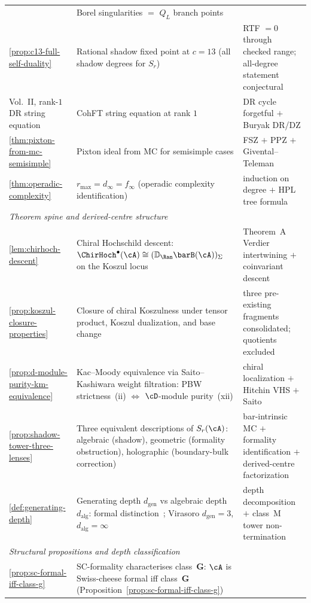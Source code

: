 \begin{center}
\begin{tabular}{lp{8cm}l}
 & Borel singularities $=$ $Q_L$ branch points \\
\ref{prop:c13-full-self-duality}
 & Rational shadow fixed point at $c = 13$
 \textup{(}all shadow degrees for \(S_r\)\textup{)}
 & RTF \(=0\) through checked range; all-degree statement conjectural \\
Vol.~II, rank-$1$ DR string equation
 & CohFT string equation at rank $1$ & DR cycle forgetful $+$ Buryak DR/DZ \\
\ref{thm:pixton-from-mc-semisimple}
 & Pixton ideal from MC for semisimple cases
 & FSZ $+$ PPZ $+$ Givental--Teleman \\
\ref{thm:operadic-complexity}
 & $r_{\max} = d_\infty = f_\infty$
 \textup{(}operadic complexity identification\textup{)}
 & induction on degree $+$ HPL tree formula \\
\hline
\multicolumn{3}{l}{\textit{Theorem spine and derived-centre structure}} \\
\hline
\ref{lem:chirhoch-descent}
 & Chiral Hochschild descent:
 $\ChirHoch^{\bullet}(\cA)
 \cong (\mathbb{D}_{\Ran}\barB(\cA))_{\Sigma}$
 on the Koszul locus
 & Theorem~A Verdier intertwining $+$ coinvariant descent \\
\ref{prop:koszul-closure-properties}
 & Closure of chiral Koszulness under tensor product,
 Koszul dualization, and base change
 & three pre-existing fragments consolidated;
 quotients excluded \\
\ref{prop:d-module-purity-km-equivalence}
 & Kac--Moody equivalence via Saito--Kashiwara weight
 filtration: PBW strictness~(ii) $\iff$
 $\cD$-module purity~(xii)
 & chiral localization $+$ Hitchin VHS $+$ Saito \\
\ref{prop:shadow-tower-three-lenses}
 & Three equivalent descriptions of $S_r(\cA)$:
 algebraic (shadow), geometric (formality obstruction),
 holographic (boundary-bulk correction)
 & bar-intrinsic MC $+$ formality identification
 $+$ derived-centre factorization \\
\ref{def:generating-depth}
 & Generating depth $d_{\mathrm{gen}}$ vs algebraic depth
 $d_{\mathrm{alg}}$: formal distinction~;
 Virasoro $d_{\mathrm{gen}} = 3$,
 $d_{\mathrm{alg}} = \infty$
 & depth decomposition $+$ class~M tower non-termination \\
\hline
\multicolumn{3}{l}{\textit{Structural propositions and depth classification}} \\
\hline
\ref{prop:sc-formal-iff-class-g}
 & SC-formality characterises class~$\mathbf{G}$:
 $\cA$ is Swiss-cheese formal iff class~$\mathbf{G}$
 \textup{(}Proposition~\ref{prop:sc-formal-iff-class-g}\textup{)}

\end{tabular}
\end{center}

